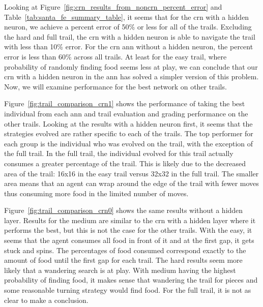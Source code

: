 Looking at Figure~\ref{fig:crn_results_from_noncrn_percent_error} and Table~\ref{tab:santa_fe_summary_table}, it seems that for the \gls{crn} with a hidden neuron, we achieve a percent error of 50\% or less for all of the trails. Excluding the hard and full trail, the \gls{crn} with a hidden neuron is able to navigate the trail with less than 10\% error. For the \gls{crn} \gls{ann} without a hidden neuron, the percent error is less than 60\% across all trails.  At least for the easy trail, where probability of randomly finding food seems less at play, we can conclude that our \gls{crn} with a hidden neuron in the \gls{ann} has solved a simpler version of this problem. Now, we will examine performance for the best network on other trails.

Figure~\ref{fig:trail_comparison_crn1} shows the performance of taking the best individual from each \gls{ann} and trail evaluation and grading performance on the other trails. Looking at the results with a hidden neuron first, it seems that the strategies evolved are rather specific to each of the trails. The top performer for each group is the individual who was evolved on the trail, with the exception of the full trail. In the full trail, the individual evolved for this trail actually consumes a greater percentage of the trail. This is likely due to the decreased area of the trail: 16x16 in the easy trail versus 32x32 in the full trail. The smaller area means that an agent can wrap around the edge of the trail with fewer moves thus consuming more food in the limited number of moves.

Figure~\ref{fig:trail_comparison_crn0} shows the same results without a hidden layer. Results for the medium are similar to the \gls{crn} with a hidden layer where it performs the best, but this is not the case for the other trails. With the easy, it seems that the agent consumes all food in front of it and at the first gap, it gets stuck and spins. The percentages of food consumed correspond exactly to the amount of food until the first gap for each trail. The hard results seem more likely that a wandering search is at play. With medium having the highest probability of finding food, it makes sense that wandering the trail for pieces and some reasonable turning strategy would find food. For the full trail, it is not as clear to make a conclusion.

